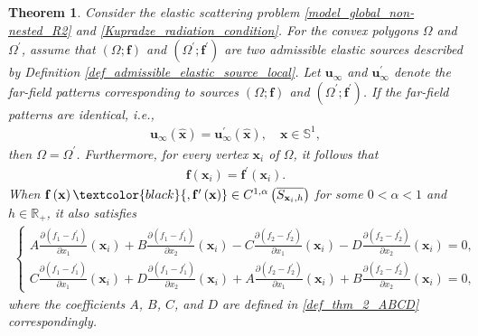 \documentclass[11pt,reqno,oneside]{amsart}
\newtheorem{theorem}{Theorem}[section]
\theoremstyle{definition}
\theoremstyle{remark}
\numberwithin{equation}{section}
\numberwithin{equation}{section}
\theoremstyle{remark}
\begin{document}
\begin{theorem} \label{thm_inverse_problem_global_uniqueness}
	Consider the elastic scattering  problem \eqref{model_global_non-nested_R2} and \eqref{Kupradze_radiation_condition}. For the convex polygons $ \Omega $ and $ \Omega^{\prime} $, assume that $\left(\Omega; \mathbf{f}\right)$ and $\left(\Omega^{\prime}; \mathbf{f}^{\prime}\right)$ are two admissible elastic sources described by Definition \ref{def_admissible_elastic_source_local}.  Let $ \mathbf{u}_{\infty} $ and $ \mathbf{u}_{\infty}^{\prime} $ denote the far-field patterns corresponding to sources $\left(\Omega; \mathbf{f}\right)$ and $\left(\Omega^{\prime}; \mathbf{f}^{\prime}\right)$. If the far-field patterns are identical, i.e.,
	\begin{align*} 
		\mathbf{u}_{\infty}\left(\hat{\mathbf{x}}\right) =\mathbf{u}_{\infty}^{\prime} \left(\hat{\mathbf{x}}\right), \quad \mathbf{x}\in\mathbb{S}^1,
	\end{align*} 
	then $ \Omega = \Omega^{\prime} $. Furthermore,  for every vertex $ \mathbf{x}_{i} $ of $ \Omega $, it follows that 
	\begin{align} \label{eq_thm_3_f=fprime}
		\mathbf{f}\left(\mathbf{x}_{i}\right)=\mathbf{f}^{\prime}\left(\mathbf{x}_{i}\right).
	\end{align}
	When $ \mathbf{f}\left(\mathbf{x}\right)\textcolor{black}{,\mathbf{f}^{\prime}\left(\mathbf{x}\right)}\in C^{1, \alpha}\left(\overline{S_{\mathbf{x}_{i},h}}\right) $ for some $ 0<\alpha<1 $ and $ h\in\mathbb{R}_+ $, it also satisfies
	\begin{align} \label{eq_thm_3_gradientf=gradientfprime}
		\begin{cases}
			A \frac{\partial \left(f_1-f^{\prime}_1\right)}{\partial x_1}\left(\mathbf{x}_{i}\right) + B \frac{\partial \left(f_1-f^{\prime}_1\right)}{\partial x_2}\left(\mathbf{x}_{i}\right) - C \frac{\partial \left(f_2-f^{\prime}_2\right)}{\partial x_1}\left(\mathbf{x}_{i}\right) - D \frac{\partial \left(f_2-f^{\prime}_2\right)}{\partial x_2}\left(\mathbf{x}_{i}\right) = 0 , \\
			C \frac{\partial \left(f_1-f^{\prime}_1\right)}{\partial x_1}\left(\mathbf{x}_{i}\right) + D \frac{\partial \left(f_1-f^{\prime}_1\right)}{\partial x_2}\left(\mathbf{x}_{i}\right) + A \frac{\partial \left(f_2-f^{\prime}_2\right)}{\partial x_1}\left(\mathbf{x}_{i}\right) + B \frac{\partial \left(f_2-f^{\prime}_2\right)}{\partial x_2}\left(\mathbf{x}_{i}\right) = 0 ,
		\end{cases}
	\end{align}
	where the coefficients $ A $, $ B $, $ C $, and $ D $ are defined in \eqref{def_thm_2_ABCD} correspondingly.	
\end{theorem}
\end{document}
